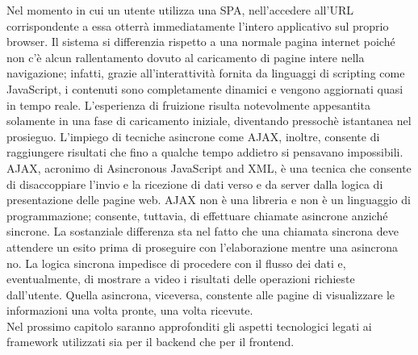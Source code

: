 Nel momento in cui un utente utilizza una SPA, nell'accedere all'URL corrispondente a essa otterrà immediatamente l'intero applicativo sul proprio browser.
Il sistema si differenzia rispetto a una normale pagina internet poiché non c'è alcun rallentamento dovuto al caricamento di pagine intere nella navigazione; infatti, grazie 
all'interattività fornita da linguaggi di scripting come JavaScript, i contenuti sono completamente dinamici e vengono aggiornati quasi in tempo reale.
L'esperienza di fruizione risulta notevolmente appesantita solamente in una fase di caricamento iniziale, diventando pressochè istantanea nel prosieguo.
L'impiego di tecniche asincrone come AJAX, inoltre, consente di raggiungere risultati che fino a qualche tempo addietro si pensavano impossibili.
AJAX, acronimo di Asincronous JavaScript and XML, è una tecnica che consente di disaccoppiare l'invio e la ricezione di dati verso e da server dalla logica di presentazione delle pagine web.
AJAX non è una libreria e non è un linguaggio di programmazione; consente, tuttavia, di effettuare chiamate asincrone anziché sincrone.
La sostanziale differenza sta nel fatto che una chiamata sincrona deve attendere un esito prima di proseguire con l'elaborazione mentre una asincrona no.
La logica sincrona impedisce di procedere con il flusso dei dati e, eventualmente, di mostrare a video i risultati delle operazioni richieste dall'utente.
Quella asincrona, viceversa, constente alle pagine di visualizzare le informazioni una volta pronte, una volta ricevute.
\\
Nel prossimo capitolo saranno approfonditi gli aspetti tecnologici legati ai framework utilizzati sia per il backend che per il frontend.